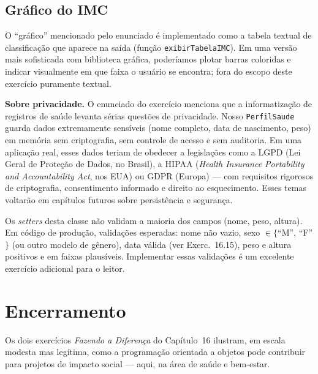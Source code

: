 \documentclass[11pt,a4paper]{article}
\begin{document}
\subsection*{Gr\'afico do IMC}

O ``gr\'afico'' mencionado pelo enunciado \'e implementado como a tabela textual de classifica\c{c}\~ao que aparece na sa\'ida (fun\c{c}\~ao \texttt{exibirTabelaIMC}). Em uma vers\~ao mais sofisticada com biblioteca gr\'afica, poder\'iamos plotar barras coloridas e indicar visualmente em que faixa o usu\'ario se encontra; fora do escopo deste exerc\'icio puramente textual.

\begin{obseng}
\textbf{Sobre privacidade.} O enunciado do exerc\'icio menciona que a informatiza\c{c}\~ao de registros de sa\'ude levanta s\'erias quest\~oes de privacidade. Nosso \texttt{PerfilSaude} guarda dados extremamente sens\'iveis (nome completo, data de nascimento, peso) em mem\'oria sem criptografia, sem controle de acesso e sem auditoria. Em uma aplica\c{c}\~ao real, esses dados teriam de obedecer a legisla\c{c}\~oes como a LGPD (Lei Geral de Prote\c{c}\~ao de Dados, no Brasil), a HIPAA (\emph{Health Insurance Portability and Accountability Act}, nos EUA) ou GDPR (Europa) --- com requisitos rigorosos de criptografia, consentimento informado e direito ao esquecimento. Esses temas voltar\~ao em cap\'itulos futuros sobre persist\^encia e seguran\c{c}a.
\end{obseng}

\begin{boaprat}
Os \emph{setters} desta classe n\~ao validam a maioria dos campos (nome, peso, altura). Em c\'odigo de produ\c{c}\~ao, valida\c{c}\~oes esperadas: nome n\~ao vazio, sexo $\in \{$``M'', ``F''$\}$ (ou outro modelo de g\^enero), data v\'alida (ver Exerc.~16.15), peso e altura positivos e em faixas plaus\'iveis. Implementar essas valida\c{c}\~oes \'e um excelente exerc\'icio adicional para o leitor.
\end{boaprat}

\section*{Encerramento}

Os dois exerc\'icios \emph{Fazendo a Diferen\c{c}a} do Cap\'itulo~16 ilustram, em escala modesta mas leg\'itima, como a programa\c{c}\~ao orientada a objetos pode contribuir para projetos de impacto social --- aqui, na \'area de sa\'ude e bem-estar.
\end{document}
